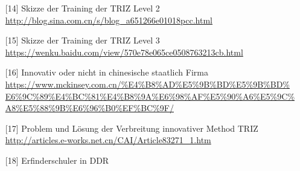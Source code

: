 \documentclass[11pt,a4paper]{article}
\begin{document}
\begin{itemize}
\item[{[14]}]  Skizze der Training der TRIZ Level 2
\url{http://blog.sina.com.cn/s/blog_a651266e01018pcc.html}
\item[{[15]}] Skizze der Training der TRIZ Level 3
\url{https://wenku.baidu.com/view/570e78e065ce0508763213cb.html}
\item[{[16]}] Innovativ oder nicht in chinesische staatlich Firma
\url{https://www.mckinsey.com.cn/%E4%B8%AD%E5%9B%BD%E5%9B%BD%E6%9C%89%E4%BC%81%E4%B8%9A%E6%98%AF%E5%90%A6%E5%9C%A8%E5%88%9B%E6%96%B0%EF%BC%9F/}
\item[{[17]}] Problem und Lösung der Verbreitung innovativer Method TRIZ
\url{http://articles.e-works.net.cn/CAI/Article83271_1.htm}
\item[{[18]}] Erfinderschuler in DDR
\end{itemize}
\end{document}
